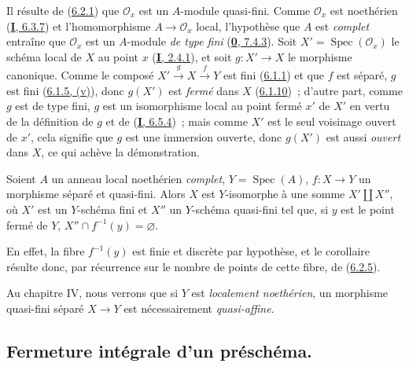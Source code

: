 Il résulte de (\hyperref[II.6.2.1-fr]{6.2.1}) que $\mathcal{O}_x$ est un
$A$-module quasi-fini. Comme $\mathcal{O}_x$ est noethérien
(\hyperref[I.6.3.7-fr]{\textbf{I}, 6.3.7}) et l'homomorphisme
$A\to\mathcal{O}_x$ local, l'hypothèse que $A$ est \emph{complet} entraîne que
$\mathcal{O}_x$ est un $A$-module \emph{de type fini}
(\hyperref[0.7.4.3-fr]{\textbf{0}, 7.4.3}). Soit
$X'=\operatorname{Spec}(\mathcal{O}_x)$ le schéma local de $X$ au point $x$
(\hyperref[I.2.4.1-fr]{\textbf{I}, 2.4.1}), et soit $g:X'\to X$ le morphisme
canonique. Comme le composé $X'\xrightarrow{g}X\xrightarrow{f}Y$ est fini
(\hyperref[II.6.1.1-fr]{6.1.1}) et que $f$ est séparé, $g$ est fini
(\hyperref[II.6.1.5-fr]{6.1.5, (v)}), donc $g(X')$ est \emph{fermé} dans $X$
(\hyperref[II.6.1.10-fr]{6.1.10})~; d'autre part, comme $g$ est de type fini,
$g$ est un isomorphisme local au point fermé $x'$ de $X'$ en vertu de la
définition de $g$ et de (\hyperref[I.6.5.4-fr]{\textbf{I}, 6.5.4})~; mais comme $X'$
est le seul voisinage ouvert de $x'$, cela signifie que $g$ est une immersion
ouverte, donc $g(X')$ est aussi \emph{ouvert} dans $X$, ce qui achève la
démonstration.

\begin{corollary}[6.2.6]
\label{II.6.2.6-fr}
Soient $A$ un anneau local noethérien \emph{complet}, $Y=\operatorname{Spec}(A)$,
$f:X\to Y$ un morphisme séparé et quasi-fini. Alors $X$ est $Y$-isomorphe à
une somme $X'\amalg X''$, où $X'$ est un $Y$-schéma fini et $X''$ un
$Y$-schéma quasi-fini tel que, si $y$ est le point fermé de $Y$,
$X''\cap f^{-1}(y)=\varnothing$.
\end{corollary}

En effet, la fibre $f^{-1}(y)$ est finie et discrète par hypothèse, et le
corollaire résulte donc, par récurrence sur le nombre de points de cette
fibre, de (\hyperref[II.6.2.5-fr]{6.2.5}).

\begin{remark}[6.2.7]
\label{II.6.2.7-fr}
Au chapitre IV, nous verrons que si $Y$ est \emph{localement noethérien}, un morphisme
quasi-fini séparé $X\to Y$ est nécessairement \emph{quasi-affine}.
\end{remark}

\subsection{Fermeture intégrale d'un préschéma.}
\label{subsection:II.6.3-fr}

